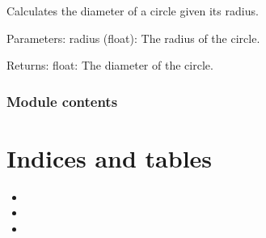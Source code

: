 \documentclass[letterpaper,10pt,english]{sphinxmanual}
\begin{document}

\begin{fulllineitems}
\label{\detokenize{src:src.circle.calculate_diameter}}
\pysigstartsignatures
{}
\pysigstopsignatures
\sphinxAtStartPar
Calculates the diameter of a circle given its radius.

\sphinxAtStartPar
Parameters:
radius (float): The radius of the circle.

\sphinxAtStartPar
Returns:
float: The diameter of the circle.

\end{fulllineitems}



\subsection{Module contents}
\label{\detokenize{src:module-src}}\label{\detokenize{src:module-contents}}

\chapter{Indices and tables}
\label{\detokenize{index:indices-and-tables}}\begin{itemize}
\item {} 
\sphinxAtStartPar
{}

\item {} 
\sphinxAtStartPar
{}

\item {} 
\sphinxAtStartPar
{}

\end{itemize}


\renewcommand{\indexname}{Python Module Index}
\begin{sphinxtheindex}
\let\bigletter\sphinxstyleindexlettergroup
\bigletter{s}
\item\relax{}
\item\relax{}
\end{sphinxtheindex}

\renewcommand{\indexname}{Index}
\printindex
\end{document}
